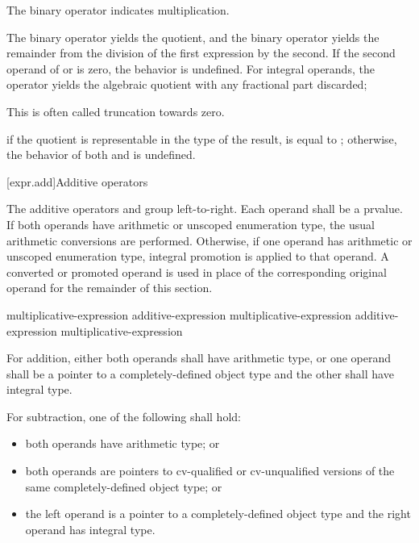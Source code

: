 \pnum
The binary \tcode{*} operator indicates multiplication.

\pnum
The binary \tcode{/} operator yields the quotient, and the binary
\tcode{\%} operator yields the remainder from the division of the first
expression by the second.
%
If the second operand of \tcode{/} or \tcode{\%} is zero, the behavior is
undefined.
For integral operands, the \tcode{/} operator yields the algebraic quotient with
any fractional part discarded;
\begin{footnote}
This is often called truncation towards zero.
\end{footnote}
if the quotient  is representable in the type of the result,
 is equal to ; otherwise, the behavior
of both  and  is undefined.

[expr.add]{Additive operators}%
%

\pnum
The additive operators \tcode{+} and \tcode{-} group left-to-right.
Each operand shall be a prvalue.
If both operands have arithmetic or unscoped enumeration type,
the usual arithmetic conversions are performed.
Otherwise, if one operand has arithmetic or unscoped enumeration type,
integral promotion is applied to that operand.
A converted or promoted operand is used in place of
the corresponding original operand for the remainder of this section.

%
%
%
%
%
%
%
\begin{bnf}
\br
    multiplicative-expression\br
    additive-expression \terminal{+} multiplicative-expression\br
    additive-expression \terminal{-} multiplicative-expression
\end{bnf}

%
For addition, either both operands shall have arithmetic
type, or one operand shall be a pointer to a completely-defined object
type and the other shall have integral type.

\pnum
For subtraction, one of the following shall hold:
\begin{itemize}
\item both operands have arithmetic type; or

\item
{}%
both operands are pointers to cv-qualified or cv-unqualified
versions of the same completely-defined object type; or

\item the left operand is a pointer to a completely-defined object type
and the right operand has integral type.
\end{itemize}

